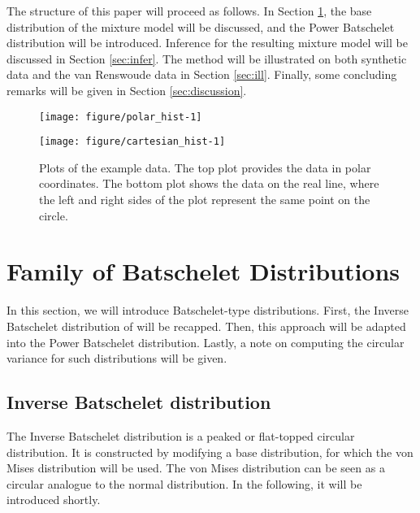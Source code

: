 The structure of this paper will proceed as follows. In Section \ref{sec:model}, the base distribution of the mixture model will be discussed, and the Power Batschelet distribution will be introduced. Inference for the resulting mixture model will be discussed in Section \ref{sec:infer}. The method will be illustrated on both synthetic data and the van Renswoude data in Section \ref{sec:ill}. Finally, some concluding remarks will be given in Section \ref{sec:discussion}.






\begin{figure}
\centering
\begin{knitrout}
\color{fgcolor}
\texttt{[image: figure/polar\_hist-1]} 

\end{knitrout}
\centering \vspace{-1.5cm}
\begin{knitrout}
\color{fgcolor}
\texttt{[image: figure/cartesian\_hist-1]} 

\end{knitrout}
\caption{Plots of the example data. The top plot provides the data in polar coordinates. The bottom plot shows the data on the real line, where the left and right sides of the plot represent the same point on the circle.}
\label{scd_ex}
\end{figure}

\section{Family of Batschelet Distributions}
\label{sec:model}

In this section, we will introduce Batschelet-type distributions. First, the Inverse Batschelet distribution of \citet{jones2012inverse} will be recapped. Then, this approach will be adapted into the Power Batschelet distribution. Lastly, a note on computing the circular variance for such distributions will be given.

\subsection{Inverse Batschelet distribution}

The Inverse Batschelet distribution is a peaked or flat-topped circular distribution. It is constructed by modifying a base distribution, for which the von Mises distribution will be used. The von Mises distribution can be seen as a circular analogue to the normal distribution. In the following, it will be introduced shortly.

